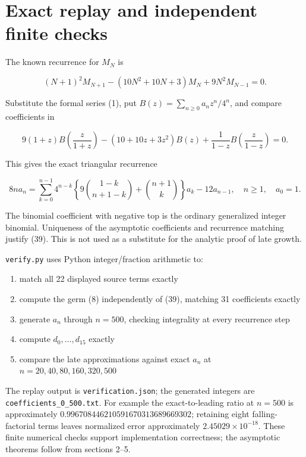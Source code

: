 \documentclass[11pt,letterpaper]{article}
\providecommand{\tightlist}{\setlength{\itemsep}{0pt}\setlength{\parskip}{0pt}}
\theoremstyle{remark}
\begin{document}
\section{Exact replay and independent finite
checks}\label{exact-replay-and-independent-finite-checks}

The known recurrence for \(M_N\) is

\[
(N+1)^2M_{N+1}-(10N^2+10N+3)M_N+9N^2M_{N-1}=0.
\tag{37}
\]

Substitute the formal series (1), put \(B(z)=\sum_{n\ge0}a_nz^n/4^n\),
and compare coefficients in

\[
9(1+z)B\left(\frac z{1+z}\right)-(10+10z+3z^2)B(z)
+\frac1{1-z}B\left(\frac z{1-z}\right)=0.
\tag{38}
\]

This gives the exact triangular recurrence

\[
8na_n=\sum_{k=0}^{n-1}4^{n-k}
\left\{9\binom{1-k}{n+1-k}+\binom{n+1}{k}\right\}a_k-12a_{n-1},
\quad n\ge1,\quad a_0=1.
\tag{39}
\]

The binomial coefficient with negative top is the ordinary generalized
integer binomial. Uniqueness of the asymptotic coefficients and
recurrence matching justify (39). This is not used as a substitute for
the analytic proof of late growth.

\texttt{verify.py} uses Python integer/fraction arithmetic to:

\begin{enumerate}
\def\labelenumi{\arabic{enumi}.}
\tightlist
\item
  match all 22 displayed source terms exactly
\item
  compute the germ (8) independently of (39), matching 31 coefficients
  exactly
\item
  generate \(a_n\) through \(n=500\), checking integrality at every
  recurrence step
\item
  compute \(d_0,\ldots,d_{15}\) exactly
\item
  compare the late approximations against exact \(a_n\) at
  \(n=20,40,80,160,320,500\)
\end{enumerate}

The replay output is \texttt{verification.json}; the generated integers
are \texttt{coefficients\_0\_500.txt}. For example the exact-to-leading
ratio at \(n=500\) is approximately
\(0.996708446210591670313689669302\); retaining eight falling-factorial
terms leaves normalized error approximately \(2.45029\times10^{-18}\).
These finite numerical checks support implementation correctness; the
asymptotic theorems follow from sections 2--5.
\end{document}
